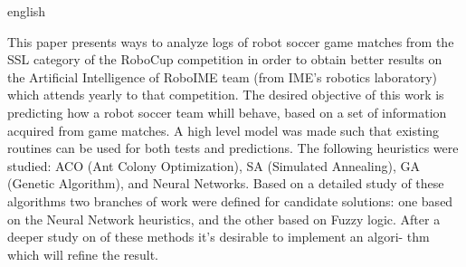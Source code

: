 \documentclass[
	12pt,				%
	oneside,			%
	a4paper,			%
	english,			%
	brazil,				%
	]{ime-abntex2}
\begin{document}
\begin{resumo}[Abstract]
\begin{otherlanguage*}{english}

This paper presents ways to analyze logs of robot soccer game matches from the
SSL category of the RoboCup competition in order to obtain better results on the Artificial
Intelligence of RoboIME team (from IME's robotics laboratory) which attends yearly to that competition.
The desired objective of this work is predicting how a robot soccer team whill behave, based
on a set of information acquired from game matches.
A high level model was made such that existing routines can be used for both tests and predictions.
The following heuristics were studied: ACO (Ant Colony Optimization), SA (Simulated Annealing), GA (Genetic Algorithm),
and Neural Networks. Based on a detailed study of these algorithms two branches of work were defined
for candidate solutions: one based on the Neural Network heuristics, and the other based on
Fuzzy logic. After a deeper study on of these methods it's desirable to implement an algori-
thm which will refine the result.


\end{otherlanguage*}
\end{resumo}

% 

%  

\tableofcontents*
\cleardoublepage

\listoffigures*
\cleardoublepage
\end{document}
